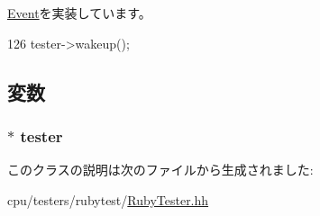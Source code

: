 \hyperlink{classEvent_a142b75b68a6291400e20fb0dd905b1c8}{Event}を実装しています。


\begin{DoxyCode}
126 { tester->wakeup(); }
\end{DoxyCode}


\subsection{変数}
\hypertarget{classRubyTester_1_1CheckStartEvent_a5f8ba0d5be58d6302adaccb375d74bc2}{
\subsubsection[{tester}]{$\ast$ {\bf tester}}}
\label{classRubyTester_1_1CheckStartEvent_a5f8ba0d5be58d6302adaccb375d74bc2}


このクラスの説明は次のファイルから生成されました:\begin{DoxyCompactItemize}
\item 
cpu/testers/rubytest/\hyperlink{RubyTester_8hh}{RubyTester.hh}\end{DoxyCompactItemize}
